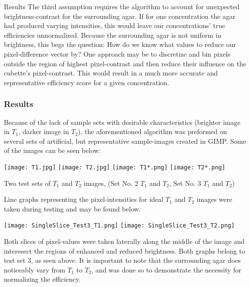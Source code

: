 \documentclass[a4paper,12pt]{article}
\begin{document}
\begin{section}{Results}
The third assumption requires the algorithm to account for unexpected brightness-contrast for the surrounding agar. If for one concentration the agar had produced varying intensities, this would leave our concentrations' true efficiencies unnormalized. Because the surrounding agar is not uniform in brightness, this begs the question: How do we know what values to reduce our pixel-difference vector by? One approach may be to discretize and bin pixels outside the region of highest pixel-contrast and then reduce their influence on the cubette's pixel-contrast. This would result in a much more accurate and representative efficiency score for a given concentration. 

\subsubsection{Results}

Because of the lack of sample sets with desirable characteristics (brighter image in $T_1$, darker image in $T_2$), the aforementioned algorithm was preformed on several sets of artificial, but representative sample-images created in GIMP. Some of the images can be seen below:

\begin{center}
\texttt{[image: T1.jpg]}
\texttt{[image: T2.jpg]}
\texttt{[image: T1*.png]}
\texttt{[image: T2*.png]}
\end{center}
\begin{center}
\small{Two test sets of $T_1$ and $T_2$ images, (Set No. 2 $T_1$ and $T_2$, Set No. 3 $T_1$ and $T_2$)}
\end{center}

Line graphs representing the pixel-intensities for ideal $T_1$ and $T_2$ images were taken during testing and may be found below:

\begin{center}
\texttt{[image: SingleSlice\_Test3\_T1.png]}
\texttt{[image: SingleSlice\_Test3\_T2.png]}
\end{center}

Both slices of pixel-values were taken laterally along the middle of the image and interesect the regions of enhanced and reduced brightness. Both graphs belong to test set 3, as seen above. It is important to note that the surrounding agar does noticeably vary from $T_1$ to $T_2$, and was done so to demonstrate the necessity for normalizing the efficiency.\\


\end{section}
\end{document}
